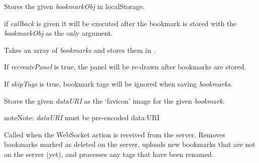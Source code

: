\documentclass[letterpaper,10pt,openany]{sphinxmanual}
\begin{document}

\begin{fulllineitems}
\label{Applications/terminal/plugin_bookmarks:GateOne.Bookmarks.storeBookmark}
Stores the given \emph{bookmarkObj} in localStorage.

if \emph{callback} is given it will be executed after the bookmark is stored with the \emph{bookmarkObj} as the only argument.

\end{fulllineitems}


\begin{fulllineitems}
\label{Applications/terminal/plugin_bookmarks:GateOne.Bookmarks.storeBookmarks}
Takes an array of \emph{bookmarks} and stores them in .

If \emph{recreatePanel} is true, the panel will be re-drawn after bookmarks are stored.

If \emph{skipTags} is true, bookmark tags will be ignored when saving \emph{bookmarks}.

\end{fulllineitems}


\begin{fulllineitems}
\label{Applications/terminal/plugin_bookmarks:GateOne.Bookmarks.storeFavicon}
Stores the given \emph{dataURI} as the `favicon' image for the given \emph{bookmark}.

\begin{notice}{note}{Note:}
\emph{dataURI} must be pre-encoded data:URI
\end{notice}

\end{fulllineitems}


\begin{fulllineitems}
\label{Applications/terminal/plugin_bookmarks:GateOne.Bookmarks.syncBookmarks}
Called when the  WebSocket action is received from the server.  Removes bookmarks marked as deleted on the server, uploads new bookmarks that are not on the server (yet), and processes any tags that have been renamed.

\end{fulllineitems}
\end{document}
